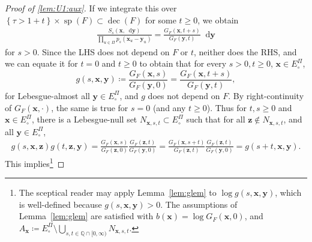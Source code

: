 \documentclass[reqno,draft]{amsart}
\numberwithin{equation}{section}
\theoremstyle{plain}
\theoremstyle{remark}
\newcommand{\Q}{\mathbb{Q}} %
\newcommand*\diff{\mathop{}\!\mathrm{d}}
\newcommand{\ind}{\mathds{1}}
\newcommand{\fpart}{\Pi} %
\DeclareMathOperator{\dcb}{dec}
\DeclareMathOperator{\dcs}{sp}
\newcommand{\semi}{S}
\begin{document}
\begin{proof}[Proof of \cref{lem:U1:aux}]
    If we integrate this over $\left\{ \tau > 1 + t \right\} \times\dcs(F) \subset \dcb(F) $ for some $t \ge 0$, we obtain
    \begin{align}\label{eqprf:U1:5}
        \frac{\semi_s(\boldsymbol x,\diff \boldsymbol y)}{\prod_{u\in\fpart}p_s(\boldsymbol x_u-\boldsymbol y_u)} = \frac{G_F(\boldsymbol x,t+s )}{G_F(\boldsymbol y,t )}\diff \boldsymbol y %
    \end{align}
    for $s > 0$. Since the LHS does not depend on $F$ or $t$, neither does the RHS, and we can equate it for $t = 0$ and $t \ge 0$ to obtain that for every $s > 0,t \ge 0$, $\boldsymbol x\in E^\fpart_\circ $,
    \begin{equation}\label{eqprf:U1:5.5}
        g(s,\boldsymbol x,\boldsymbol y) \coloneqq \frac{G_F(\boldsymbol x,s )}{G_F(\boldsymbol y,0) } = \frac{G_F(\boldsymbol x,t+s )}{G_F(\boldsymbol y,t )},
    \end{equation}
    for Lebesgue-almost all $\boldsymbol y\in E^\fpart_\circ $, and $g$ does not depend on $F$. By right-continuity of $G_F(\boldsymbol x,\cdot )$, the same is true for $s = 0$ (and any $t \ge 0$). Thus for $t, s \ge 0$ and $\boldsymbol x \in E^\fpart_\circ $, there is a Lebesgue-null set $N_{\boldsymbol x,s,t}\subset E^\fpart_\circ $ such that for all $\boldsymbol z\not\in N_{\boldsymbol x,s,t}$, and all $\boldsymbol y \in E^\fpart_\circ $,
    \begin{align*}
        g(s,\boldsymbol x,\boldsymbol z)g(t,\boldsymbol z,\boldsymbol y) = \frac{G_F(\boldsymbol x,s)}{G_F(\boldsymbol z,0)} \frac{G_F(\boldsymbol z,t)}{G_F(\boldsymbol y,0)} = \frac{G_F(\boldsymbol x,s+t)}{G_F(\boldsymbol z,t)} \frac{G_F(\boldsymbol z,t)}{G_F(\boldsymbol y,0)} = g(s+t,\boldsymbol x,\boldsymbol y).
    \end{align*}
    This implies\footnote{%
        The sceptical reader may apply Lemma~\ref{lem:glem} to $\log g(s,\boldsymbol x,\boldsymbol y)$, which is well-defined because $g(s,\boldsymbol x,\boldsymbol y) > 0$. The assumptions of Lemma~\ref{lem:glem} are satisfied with $b(\boldsymbol x) = \log G_F(\boldsymbol x,0)$, and $A_{\boldsymbol x} \coloneqq E^\fpart_\circ \setminus \bigcup_{s,t\in \Q \cap [0,\infty)} N_{\boldsymbol x,s,t}$.
    }

\end{proof}
\end{document}
